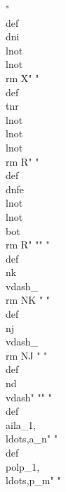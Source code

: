 "\\def\\dni{\\lnot\\lnot{\\rm X}}"
"\\def\\tnr{\\lnot\\lnot\\lnot{\\rm R}}"
"\\def\\dnfe{\\lnot\\lnot\\bot{\\rm R}}"
""
"\\def\\nk{\\vdash_{\\rm NK}} "
"\\def\\nj{\\vdash_{\\rm NJ}} "
"\\def\\nd{\\vdash}"
""
"\\def\\ail{{a_1,\\ldots,a_n}}"
"\\def\\pol{{p_1,\\ldots,p_m}}"
"%